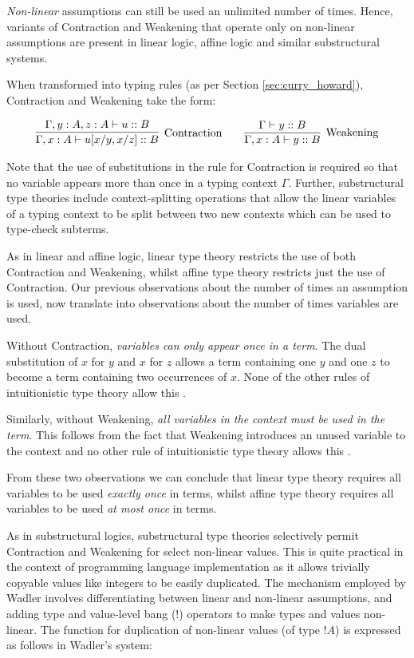 \documentclass[]{unswthesis}
\begin{document}
\textit{Non-linear} assumptions can still be used an unlimited number of times. Hence, variants of Contraction and Weakening that operate only on non-linear assumptions are present in linear logic, affine logic and similar substructural systems.

When transformed into typing rules (as per Section \ref{sec:curry_howard}), Contraction and Weakening take the form:

\begin{eqnarray*}
\infer[\text{Contraction}]{\Gamma, x : A \vdash u[x/y, x/z] :: B}{
	\Gamma, y : A, z : A \vdash u :: B
}
\qquad
\infer[\text{Weakening}]{\Gamma, x : A \vdash y :: B}{
    \Gamma\vdash y :: B
}
\end{eqnarray*}

Note that the use of substitutions in the rule for Contraction is required so that no variable appears more than once in a typing context $\Gamma$. Further, substructural type theories include context-splitting operations that allow the linear variables of a typing context to be split between two new contexts which can be used to type-check subterms.

As in linear and affine logic, linear type theory restricts the use of both Contraction and Weakening, whilst affine type theory restricts just the use of Contraction. Our previous observations about the number of times an assumption is used, now translate into observations about the number of times variables are used.

Without Contraction, \textit{variables can only appear once in a term}. The dual substitution of $x$ for $y$ and $x$ for $z$ allows a term containing one $y$ and one $z$ to become a term containing two occurrences of $x$. None of the other rules of intuitionistic type theory allow this \cite{wadler93}.

Similarly, without Weakening, \textit{all variables in the context must be used in the term}. This follows from the fact that Weakening introduces an unused variable to the context and no other rule of intuitionistic type theory allows this \cite{wadler93}.

From these two observations we can conclude that linear type theory requires all variables to be used \textit{exactly once} in terms, whilst affine type theory requires all variables to be used \textit{at most once} in terms.

As in substructural logics, substructural type theories selectively permit Contraction and Weakening for select non-linear values. This is quite practical in the context of programming language implementation as it allows trivially copyable values like integers to be easily duplicated. The mechanism employed by Wadler \cite{wadler93} involves differentiating between linear and non-linear assumptions, and adding type and value-level bang (!) operators to make types and values non-linear. The function for duplication of non-linear values (of type $!A$) is expressed as follows in Wadler's system:
\end{document}
